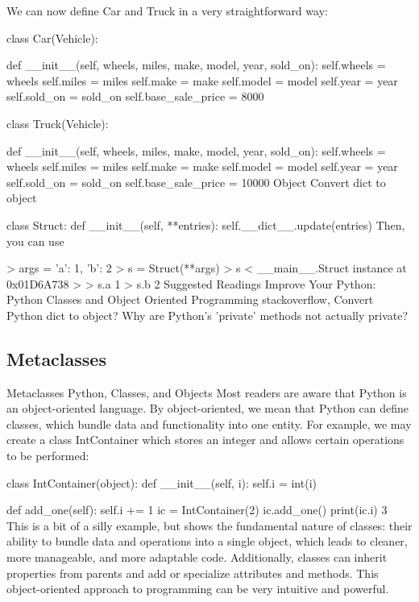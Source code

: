 We can now define Car and Truck in a very straightforward way:

class Car(Vehicle):

    def __init__(self, wheels, miles, make, model, year, sold_on):
        self.wheels = wheels
        self.miles = miles
        self.make = make
        self.model = model
        self.year = year
        self.sold_on = sold_on
        self.base_sale_price = 8000


class Truck(Vehicle):

    def __init__(self, wheels, miles, make, model, year, sold_on):
        self.wheels = wheels
        self.miles = miles
        self.make = make
        self.model = model
        self.year = year
        self.sold_on = sold_on
        self.base_sale_price = 10000
Object
Convert dict to object

class Struct:
    def __init__(self, **entries):
        self.__dict__.update(entries)
Then, you can use

> args = {'a': 1, 'b': 2}
> s = Struct(**args)
> s
< __main__.Struct instance at 0x01D6A738 >
> s.a
1
> s.b
2
Suggested Readings
Improve Your Python: Python Classes and Object Oriented Programming
stackoverflow, Convert Python dict to object?
Why are Python's 'private' methods not actually private?

\subsection{Metaclasses}

Metaclasses
Python, Classes, and Objects
Most readers are aware that Python is an object-oriented language. By object-oriented, we mean that Python can define classes, which bundle data and functionality into one entity. For example, we may create a class IntContainer which stores an integer and allows certain operations to be performed:

class IntContainer(object):
    def __init__(self, i):
        self.i = int(i)

    def add_one(self):
        self.i += 1
ic = IntContainer(2)
ic.add_one()
print(ic.i)
3
This is a bit of a silly example, but shows the fundamental nature of classes: their ability to bundle data and operations into a single object, which leads to cleaner, more manageable, and more adaptable code. Additionally, classes can inherit properties from parents and add or specialize attributes and methods. This object-oriented approach to programming can be very intuitive and powerful.

